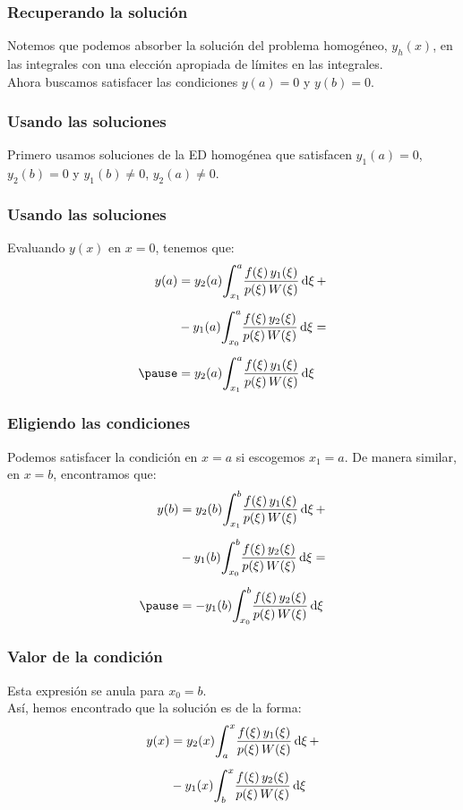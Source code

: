 \documentclass[12pt]{beamer}
\begin{document}
\begin{frame}
\frametitle{Recuperando la solución}
Notemos que podemos absorber la solución del problema homogéneo, $y_{h} (x)$, en las integrales con una elección apropiada de límites en las integrales.
\\
\bigskip
\pause
Ahora buscamos satisfacer las condiciones $y (a) = 0$ y $y (b) = 0$.
\end{frame}
\begin{frame}
\frametitle{Usando las soluciones}
Primero usamos soluciones de la ED homogénea que satisfacen $y_{1} (a) = 0$, $y_{2} (b) = 0$ y $y_{1} (b) \neq 0$, $y_{2} (a) \neq 0$.
\end{frame}
\begin{frame}
\frametitle{Usando las soluciones}
Evaluando $y (x)$ en $x = 0$, tenemos que:
\pause
\begin{eqnarray}
\begin{aligned}[b]
y (a) &= y_{2} (a) \scaleint{6ex}_{\bs x_{1}}^{a} \dfrac{f (\xi) \, y_{1} (\xi)}{p (\xi) \, W (\xi)} \dd{\xi} + \\[0.5em] 
&- y_{1} (a) \scaleint{6ex}_{\bs x_{0}}^{a} \dfrac{f (\xi) \, y_{2} (\xi)}{p (\xi) \, W (\xi)} \dd{\xi} = \\[0.5em] \pause
&= y_{2} (a) \scaleint{6ex}_{\bs x_{1}}^{a} \dfrac{f (\xi) \, y_{1} (\xi)}{p (\xi) \, W (\xi)} \dd{\xi}
\end{aligned}
\label{eq:ecuacion_07_27}
\end{eqnarray}
\end{frame}
\begin{frame}
\frametitle{Eligiendo las condiciones}
Podemos satisfacer la condición en $x = a$ si escogemos $x_{1} = a$. \pause De manera similar, en $x = b$, encontramos que:
\pause
\begin{eqnarray}
\begin{aligned}[b]
y (b) &= y_{2} (b) \scaleint{6ex}_{\bs x_{1}}^{b} \dfrac{f (\xi) \, y_{1} (\xi)}{p (\xi) \, W (\xi)} \dd{\xi} + \\[0.5em]
&- y_{1} (b) \scaleint{6ex}_{\bs x_{0}}^{b} \dfrac{f (\xi) \, y_{2} (\xi)}{p (\xi) \, W (\xi)} \dd{\xi} = \\[0.5em] \pause
&= - y_{1} (b) \scaleint{6ex}_{\bs x_{0}}^{b} \dfrac{f (\xi) \, y_{2} (\xi)}{p (\xi) \, W (\xi)} \dd{\xi}
\end{aligned}
\label{eq:ecuacion_07_28}
\end{eqnarray}
\end{frame}
\begin{frame}
\frametitle{Valor de la condición}
Esta expresión se anula para $x_{0} = b$.
\\
\bigskip
\pause
Así, hemos encontrado que la solución es de la forma:
\pause
\begin{align}
\begin{aligned}[b]
y (x) &= y_{2} (x) \scaleint{6ex}_{\bs a}^{x} \dfrac{f (\xi) \, y_{1} (\xi)}{p (\xi) \, W (\xi)} \dd{\xi} + \\[0.5em]
&- y_{1} (x) \scaleint{6ex}_{\bs b}^{x} \dfrac{f (\xi) \, y_{2} (\xi)}{p (\xi) \, W (\xi)} \dd{\xi}
\end{aligned}
\label{eq:ecuacion_07_29}
\end{align}
\end{frame}
\end{document}

